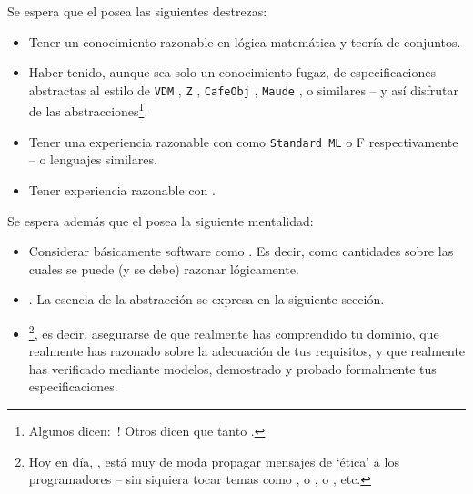 \begynd
\pind Se espera que el  posea las
      siguientes destrezas:
\afslut
\begin{itemize}
\item Tener un conocimiento razonable en  lógica matemática
  y teoría de conjuntos.
\item Haber tenido, aunque sea solo un conocimiento fugaz, de especificaciones abstractas al estilo de
  \texttt{VDM} \citevdm,
  \texttt{Z} \citez,
  \texttt{CafeObj} \citecafeobj, 
  \texttt{Maude} \cite{maude-primer,maude-manual}, o similares -- y así
  disfrutar de las abstracciones\footnote{Algunos dicen: \,! Otros dicen que tanto .}.
\item Tener una experiencia razonable con  como \texttt{Standard ML} o \textsf{F}
      \cite{MilnerTofte,Harper,MRHansen+HRischel} respectivamente
      \cite{Hansen+Rischel} -- o lenguajes similares.
    \item Tener experiencia razonable con 
      \cite{Hoa78,Hoare85,Hoare85+2004,Roscoe97,Schneider99}.
\end{itemize}
\noindent
\begynd
\pind Se espera además que el  posea
      la siguiente mentalidad:
\afslut
\begin{itemize}
\item Considerar básicamente software como . Es decir, como cantidades sobre las cuales se puede (y se debe) razonar lógicamente.
  \item {}. La esencia de
  la abstracción se expresa en la siguiente sección.

\item {}\footnote{Hoy en día, \todaytime, 
    está muy de moda propagar mensajes de `ética' a los programadores
    -- sin siquiera tocar temas como , o
    ,
    o , etc.}, es decir, asegurarse de que 
    realmente has comprendido tu dominio, que realmente has razonado
    sobre la adecuación de tus requisitos, y que realmente has
    verificado mediante modelos, demostrado y probado formalmente tus
    especificaciones.
\end{itemize}
\label{primer:Abstraction}

